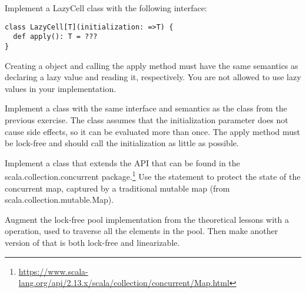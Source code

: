 \documentclass[11pt]{article}
\begin{document}
\begin{myExercise}
Implement a LazyCell class with the following interface:
\begin{lstlisting}
class LazyCell[T](initialization: =>T) {
  def apply(): T = ???
}
\end{lstlisting}
Creating a  object and calling the apply method must have the
same semantics as declaring a lazy value and reading it, respectively.
You are not allowed to use lazy values in your implementation.
\end{myExercise}

\begin{myExercise}
Implement a  class with the same interface and semantics as the  class from the previous exercise. The  class assumes that the initialization parameter does not cause side effects, so it can be evaluated more than once.
The apply method must be lock-free and should call the initialization as little as possible.
\end{myExercise}

\begin{myExercise}
Implement a  class that extends the  API that can be found in the scala.collection.concurrent package.\footnote{\url{https://www.scala-lang.org/api/2.13.x/scala/collection/concurrent/Map.html}} Use the  statement to protect the state of the concurrent map, captured by a traditional mutable map (from scala.collection.mutable.Map).
\end{myExercise}


\begin{myExercise}
Augment the lock-free pool implementation from the theoretical lessons with a  operation, used to traverse all the elements in the pool. Then make another version of  that is both lock-free and linearizable.
\end{myExercise}
\end{document}
